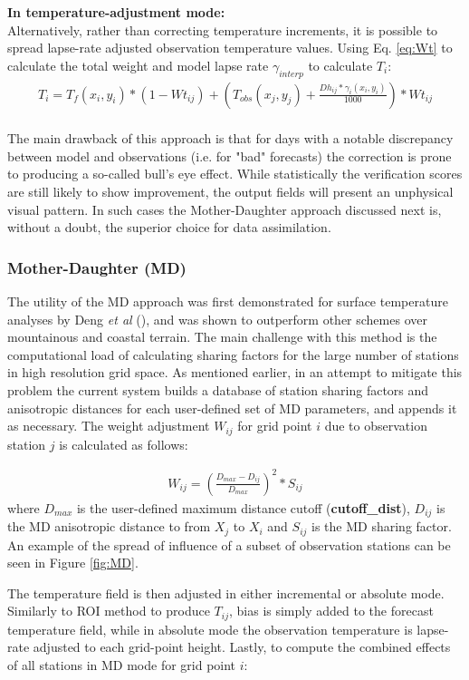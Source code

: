 \documentclass{article}
\begin{document}
\noindent\textbf{In temperature-adjustment mode:}\\
Alternatively, rather than correcting temperature increments, it is possible to spread lapse-rate adjusted observation temperature values. Using Eq. \ref{eq:Wt} to calculate the total weight and model lapse rate $\gamma_{interp}$ to calculate $T_i$:
\begin{eqnarray}
T_i = T_f(x_i,y_i) * (1-Wt_{ij}) + (T_{obs}(x_j,y_j)+ \frac{Dh_{ij}*\gamma_{i}(x_i,y_i)}{1000})*Wt_{ij}
\end{eqnarray}
\\
The main drawback of this approach is that for days with a notable discrepancy between model and observations (i.e. for "bad" forecasts) the correction is prone to producing a so-called bull's eye effect. While statistically the verification scores are still likely to show improvement, the output fields will present an unphysical visual pattern. In such cases the Mother-Daughter approach discussed next is, without a doubt, the superior choice for data assimilation.

\subsubsection{Mother-Daughter (MD)}
The utility of the MD approach was first demonstrated for surface temperature analyses by Deng \emph{et al} (\cite{Deng2005}), and was shown to outperform other schemes over mountainous and coastal terrain. The main challenge with this method is the computational load of calculating sharing factors for the large number of stations in high resolution grid space. As mentioned earlier, in an attempt to mitigate this problem the current system builds a database of station sharing factors and anisotropic distances for each user-defined set of MD parameters, and appends it as necessary. The weight adjustment $W_{ij}$ for grid point $i$ due to observation station $j$ is calculated as follows:

\begin{eqnarray}
W_{ij} = (\frac{D_{max} - D_{ij}}{D_{max}})^2 * S_{ij}
\end{eqnarray}
where $D_{max}$ is the user-defined maximum distance cutoff (\textbf{cutoff\_dist}), $D_{ij}$ is the MD anisotropic distance to from $X_j$ to $X_i$ and $S_{ij}$ is the MD sharing factor. An example of the spread of influence of a subset of observation stations can be seen in Figure \ref{fig:MD}.

The temperature field is then adjusted in either incremental or absolute mode. Similarly to ROI method to produce $T_{ij}$, bias is simply added to the forecast temperature field, while in absolute mode the observation temperature is lapse-rate adjusted to each grid-point height. Lastly, to compute the combined effects of all stations in MD mode for grid point $i$:
\end{document}
